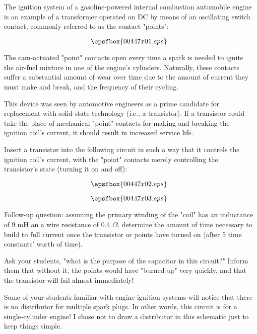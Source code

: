 

The ignition system of a gasoline-powered internal combustion automobile engine is an example of a transformer operated on DC by means of an oscillating switch contact, commonly referred to as the contact "points":

$$\epsfbox{00447x01.eps}$$

The cam-actuated "point" contacts open every time a spark is needed to ignite the air-fuel mixture in one of the engine's cylinders.  Naturally, these contacts suffer a substantial amount of wear over time due to the amount of current they must make and break, and the frequency of their cycling.

This device was seen by automotive engineers as a prime candidate for replacement with solid-state technology (i.e., a transistor).  If a transistor could take the place of mechanical "point" contacts for making and breaking the ignition coil's current, it should result in increased service life.

Insert a transistor into the following circuit in such a way that it controls the ignition coil's current, with the "point" contacts merely controlling the transistor's state (turning it on and off):

$$\epsfbox{00447x02.eps}$$







$$\epsfbox{00447x03.eps}$$

\vskip 10pt

Follow-up question: assuming the primary winding of the "coil" has an inductance of 9 mH an a wire resistance of 0.4 $\Omega$, determine the amount of time necessary to build to full current once the transistor or points have turned on (after 5 time constants' worth of time).







Ask your students, "what is the purpose of the capacitor in this circuit?"  Inform them that without it, the points would have "burned up" very quickly, and that the transistor will fail almost immediately!

Some of your students familiar with engine ignition systems will notice that there is no distributor for multiple spark plugs.  In other words, this circuit is for a single-cylinder engine!  I chose not to draw a distributor in this schematic just to keep things simple.




